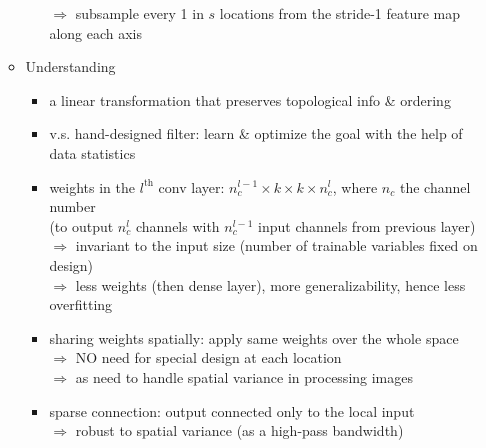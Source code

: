 \begin{itemize}
\begin{itemize}
\begin{itemize}
		$\Rightarrow$ subsample every 1 in $s$ locations from the stride-1 feature map along each axis
		\end{itemize}
	\item Understanding
		\begin{itemize}
		\item a linear transformation that preserves topological info \& ordering
		\item v.s. hand-designed filter: learn \& optimize the goal with the help of data statistics
		\item weights in the $l^\text{th}$ conv layer: $n_c^{l-1} \times k\times k \times n_c^{l}$, where $n_c$ the channel number \\
		(to output $n_c^l$ channels with $n_c^{l-1}$ input channels from previous layer) \\
		$\Rightarrow$ invariant to the input size (number of trainable variables fixed on design) \\
		$\Rightarrow$ less weights (then dense layer), more generalizability, hence less overfitting
		\item sharing weights spatially: apply same weights over the whole space \\
		$\Rightarrow$ NO need for special design at each location \\
		$\Rightarrow$ as need to handle spatial variance in processing images
		\item sparse connection: output connected only to the local input \\ 
		$\Rightarrow$ robust to spatial variance (as a high-pass bandwidth)
		\end{itemize}	
	\end{itemize}


\end{itemize}
